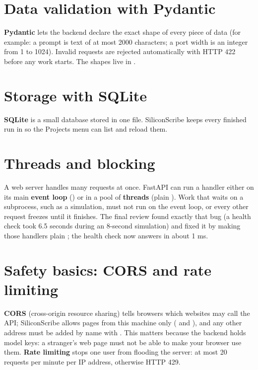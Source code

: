 \section{Data validation with Pydantic}

\textbf{Pydantic} lets the backend declare the exact shape of every piece of data (for example: a prompt is text of at most 2000 characters; a port width is an integer from 1 to 1024). Invalid requests are rejected automatically with HTTP 422 before any work starts. The shapes live in .

\section{Storage with SQLite}

\textbf{SQLite} is a small database stored in one file. SiliconScribe keeps every finished run in  so the Projects menu can list and reload them.

\section{Threads and blocking}

A web server handles many requests at once. FastAPI can run a handler either on its main \textbf{event loop} () or in a pool of \textbf{threads} (plain ). Work that waits on a subprocess, such as a simulation, must not run on the event loop, or every other request freezes until it finishes. The final review found exactly that bug (a health check took 6.5 seconds during an 8-second simulation) and fixed it by making those handlers plain ; the health check now answers in about 1 ms.

\section{Safety basics: CORS and rate limiting}

\textbf{CORS} (cross-origin resource sharing) tells browsers which websites may call the API; SiliconScribe allows pages from this machine only ( and ), and any other address must be added by name with . This matters because the backend holds model keys: a stranger's web page must not be able to make your browser use them. \textbf{Rate limiting} stops one user from flooding the server: at most 20 requests per minute per IP address, otherwise HTTP 429.
